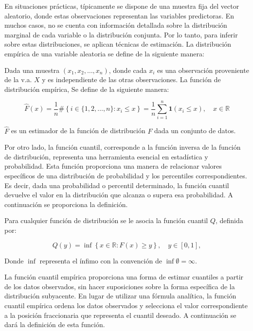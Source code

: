En situaciones prácticas, típicamente se dispone de una muestra fija del vector aleatorio, donde estas observaciones representan las variables predictoras. En muchos casos, no se cuenta con información detallada sobre la distribución marginal de cada variable o la distribución conjunta. Por lo tanto, para inferir sobre estas distribuciones, se aplican técnicas de estimación. La distribución empírica de una variable aleatoria se define de la siguiente manera:

\begin{defn}
 Dada una muestra $(x_1, x_2, \dots, x_n)$, donde cada $x_i$ es una observación proveniente de la v.a. $X$ y es independiente de las otras observaciones. La función de distribución empírica, Se define de la siguiente manera:

\begin{equation}\label{fdaEmp}
    \widehat{F}(x)=\frac{1}{n} \#\left\{i \in\{1,2, \ldots, n\}: x_i \leq x\right\}=\frac{1}{n} \sum_{i=1}^n \mathbf{1}\left(x_i \leq x\right), \quad x \in \mathbb{R}
\end{equation}    
\end{defn}

$\widehat{F}$ es un estimador de la función de distribución $F$ dada un conjunto de datos.

Por otro lado, la función cuantil, corresponde a la función inversa de la función de distribución, representa una herramienta esencial en estadística y probabilidad. Esta función proporciona una manera de relacionar valores específicos de una distribución de probabilidad y los percentiles correspondientes. Es decir, dada una probabilidad o percentil determinado, la función cuantil devuelve el valor en la distribución que alcanza o supera esa probabilidad. A continuación se proporciona la definición.

\begin{defn}\label{defcuantil}
    Para cualquier función de distribución se le asocia la función cuantil $Q$, definida por:
    
    \begin{equation}\label{eqdefcuantil}
        Q(y) = \inf \left\{ x \in \mathbb{R}: F(x) \geq y \right\}, \quad y \in [0, 1],
    \end{equation}
    
    Donde $\inf$ representa el ínfimo con la convención de $\inf \emptyset = \infty$. \cite{CopulasR}
    \end{defn}

La función cuantil empírica proporciona una forma de estimar cuantiles a partir de los datos observados, sin hacer suposiciones sobre la forma específica de la distribución subyacente. En lugar de utilizar una fórmula analítica, la función cuantil empírica ordena los datos observados y selecciona el valor correspondiente a la posición fraccionaria que representa el cuantil deseado. A continuación se dará la definición de esta función. 

